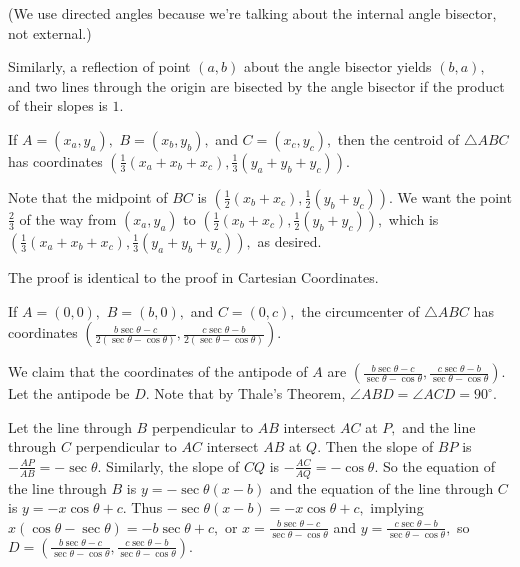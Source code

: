 \documentclass{article}
\begin{document}
(We use directed angles because we're talking about the internal angle bisector, not external.)

Similarly, a reflection of point $(a,b)$ about the angle bisector yields $(b,a),$ and two lines through the origin are bisected by the angle bisector if the product of their slopes is $1.$

\begin{theo}[Centroid]
If $A=(x_a,y_a),$ $B=(x_b,y_b),$ and $C=(x_c,y_c),$ then the centroid of $\triangle ABC$ has coordinates $(\frac{1}{3}(x_a+x_b+x_c),\frac{1}{3}(y_a+y_b+y_c)).$
\end{theo}

\begin{pro}
Note that the midpoint of $BC$ is $(\frac{1}{2}(x_b+x_c),\frac{1}{2}(y_b+y_c)).$ We want the point $\frac{2}{3}$ of the way from $(x_a,y_a)$ to $(\frac{1}{2}(x_b+x_c),\frac{1}{2}(y_b+y_c)),$ which is $(\frac{1}{3}(x_a+x_b+x_c),\frac{1}{3}(y_a+y_b+y_c)),$ as desired.
\end{pro}

The proof is identical to the proof in Cartesian Coordinates.

\begin{theo}[Circumcenter]
If $A=(0,0),$ $B=(b,0),$ and $C=(0,c),$ the circumcenter of $\triangle ABC$ has coordinates $(\frac{b\sec\theta-c}{2(\sec\theta-\cos\theta)},\frac{c\sec\theta-b}{2(\sec\theta-\cos\theta)}).$
\end{theo}

\begin{pro}
We claim that the coordinates of the antipode of $A$ are $(\frac{b\sec\theta-c}{\sec\theta-\cos\theta},\frac{c\sec\theta-b}{\sec\theta-\cos\theta}).$ Let the antipode be $D.$ Note that by Thale's Theorem, $\angle ABD=\angle ACD=90^{\circ}.$

Let the line through $B$ perpendicular to $AB$ intersect $AC$ at $P,$ and the line through $C$ perpendicular to $AC$ intersect $AB$ at $Q.$ Then the slope of $BP$ is $-\frac{AP}{AB}=-\sec\theta.$ Similarly, the slope of $CQ$ is $-\frac{AC}{AQ}=-\cos\theta.$ So the equation of the line through $B$ is $y=-\sec\theta(x-b)$ and the equation of the line through $C$ is $y=-x\cos\theta+c.$ Thus $-\sec\theta(x-b)=-x\cos\theta+c,$ implying $x(\cos\theta-\sec\theta)=-b\sec\theta+c,$ or $x=\frac{b\sec\theta-c}{\sec\theta-\cos\theta}$ and $y=\frac{c\sec\theta-b}{\sec\theta-\cos\theta},$ so $D=(\frac{b\sec\theta-c}{\sec\theta-\cos\theta},\frac{c\sec\theta-b}{\sec\theta-\cos\theta}).$
\end{pro}
\end{document}
